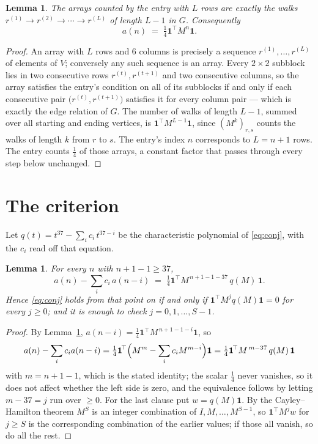 \documentclass[11pt,a4paper]{article}
\theoremstyle{plain}
\newtheorem{lemma}[theorem]{Lemma}
\theoremstyle{definition}
\begin{document}
\begin{lemma}\label{lem:walk}
The arrays counted by the entry with $L$ rows are exactly the walks
$r^{(1)}\to r^{(2)}\to\cdots\to r^{(L)}$ of length $L-1$ in $G$. Consequently
\[
a(n)\;=\;\tfrac1{4}\mathbf{1}^{\!\top}M^{n}\mathbf{1} .
\]
\end{lemma}

\begin{proof}
An array with $L$ rows and $6$ columns is precisely a sequence
$r^{(1)},\dots,r^{(L)}$ of elements of $V$; conversely any such sequence is an array.
Every $2\times2$ subblock lies in two consecutive rows $r^{(t)},r^{(t+1)}$ and two
consecutive columns, so the array satisfies the entry's condition on all of its subblocks
if and only if each consecutive pair $\bigl(r^{(t)},r^{(t+1)}\bigr)$ satisfies it for
every column pair --- which is exactly the edge relation of $G$. The number of walks of
length $L-1$, summed over all starting and ending vertices, is
$\mathbf{1}^{\!\top}M^{L-1}\mathbf{1}$, since $(M^{k})_{r,s}$ counts the walks of
length $k$ from $r$ to $s$. The entry's index $n$ corresponds to $L=n+1$ rows. The entry counts $\tfrac1{4}$ of those arrays, a constant factor that passes through every step below unchanged.
\end{proof}

\section{The criterion}

Let $q(t)=t^{37}-\sum_i c_i\,t^{37-i}$ be the characteristic polynomial of
\eqref{eq:conj}, with the $c_i$ read off that equation.

\begin{lemma}\label{lem:crit}
For every $n$ with $n+1-1\ge37$,
\[
a(n)-\sum_i c_i\,a(n-i)\;=\;\tfrac1{4}\mathbf{1}^{\!\top}M^{\,n+1-1-37}\,q(M)\,\mathbf{1} .
\]
Hence \eqref{eq:conj} holds from that point on if and only if
$\mathbf{1}^{\!\top}M^{j}q(M)\mathbf{1}=0$ for every $j\ge0$; and it is enough to check
$j=0,1,\dots,S-1$.
\end{lemma}

\begin{proof}
By Lemma~\ref{lem:walk}, $a(n-i)=\tfrac1{4}\mathbf{1}^{\!\top}M^{\,n+1-1-i}\mathbf{1}$, so
\[
a(n)-\sum_i c_i a(n-i)
=\tfrac1{4}\mathbf{1}^{\!\top}\Bigl(M^{m}-\sum_i c_i M^{m-i}\Bigr)\mathbf{1}
=\tfrac1{4}\mathbf{1}^{\!\top}M^{\,m-37}\,q(M)\,\mathbf{1}
\]
with $m=n+1-1$, which is the stated identity; the scalar $\tfrac1{4}$ never vanishes, so it does not affect whether the left side is zero, and the equivalence follows by letting
$m-37=j$ run over $\ge0$. For the last clause put $w=q(M)\mathbf{1}$. By the
Cayley--Hamilton theorem $M^{S}$ is an integer combination of $I,M,\dots,M^{S-1}$, so
$\mathbf{1}^{\!\top}M^{j}w$ for $j\ge S$ is the corresponding combination of the earlier
values; if those all vanish, so do all the rest.
\end{proof}
\end{document}
